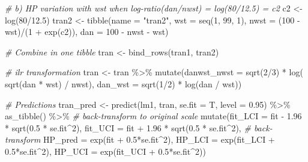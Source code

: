 \documentclass[
  12pt,
]{article}
\newenvironment{Shaded}{\begin{snugshade}}{\end{snugshade}}
\newcommand{\AttributeTok}[1]{\textcolor[rgb]{0.77,0.63,0.00}{#1}}
\newcommand{\CommentTok}[1]{\textcolor[rgb]{0.56,0.35,0.01}{\textit{#1}}}
\newcommand{\DecValTok}[1]{\textcolor[rgb]{0.00,0.00,0.81}{#1}}
\newcommand{\FloatTok}[1]{\textcolor[rgb]{0.00,0.00,0.81}{#1}}
\newcommand{\FunctionTok}[1]{\textcolor[rgb]{0.00,0.00,0.00}{#1}}
\newcommand{\NormalTok}[1]{#1}
\newcommand{\OtherTok}[1]{\textcolor[rgb]{0.56,0.35,0.01}{#1}}
\newcommand{\SpecialCharTok}[1]{\textcolor[rgb]{0.00,0.00,0.00}{#1}}
\newcommand{\StringTok}[1]{\textcolor[rgb]{0.31,0.60,0.02}{#1}}
\begin{document}
\begin{Shaded}
\begin{Highlighting}[]
\CommentTok{\# b) HP variation with wst when log{-}ratio(dan/nwst) = log(80/12.5) = c2}
\NormalTok{c2 }\OtherTok{\textless{}{-}} \FunctionTok{log}\NormalTok{(}\DecValTok{80}\SpecialCharTok{/}\FloatTok{12.5}\NormalTok{)}
\NormalTok{tran2 }\OtherTok{\textless{}{-}} \FunctionTok{tibble}\NormalTok{(}\AttributeTok{name =} \StringTok{"tran2"}\NormalTok{,}
                \AttributeTok{wst =} \FunctionTok{seq}\NormalTok{(}\DecValTok{1}\NormalTok{, }\DecValTok{99}\NormalTok{, }\DecValTok{1}\NormalTok{),}
                \AttributeTok{nwst =}\NormalTok{ (}\DecValTok{100} \SpecialCharTok{{-}}\NormalTok{ wst)}\SpecialCharTok{/}\NormalTok{(}\DecValTok{1} \SpecialCharTok{+} \FunctionTok{exp}\NormalTok{(c2)), }
                \AttributeTok{dan =} \DecValTok{100} \SpecialCharTok{{-}}\NormalTok{ nwst }\SpecialCharTok{{-}}\NormalTok{ wst)}

\CommentTok{\# Combine in one tibble}
\NormalTok{tran }\OtherTok{\textless{}{-}} \FunctionTok{bind\_rows}\NormalTok{(tran1, tran2)}

\CommentTok{\# ilr transformation}
\NormalTok{tran }\OtherTok{\textless{}{-}}\NormalTok{ tran }\SpecialCharTok{\%\textgreater{}\%} 
  \FunctionTok{mutate}\NormalTok{(}\AttributeTok{danwst\_nwst =} \FunctionTok{sqrt}\NormalTok{(}\DecValTok{2}\SpecialCharTok{/}\DecValTok{3}\NormalTok{) }\SpecialCharTok{*} \FunctionTok{log}\NormalTok{( }\FunctionTok{sqrt}\NormalTok{(dan }\SpecialCharTok{*}\NormalTok{ wst) }\SpecialCharTok{/}\NormalTok{ nwst),}
         \AttributeTok{dan\_wst =} \FunctionTok{sqrt}\NormalTok{(}\DecValTok{1}\SpecialCharTok{/}\DecValTok{2}\NormalTok{) }\SpecialCharTok{*} \FunctionTok{log}\NormalTok{(dan }\SpecialCharTok{/}\NormalTok{ wst))}

\CommentTok{\# Predictions}
\NormalTok{tran\_pred }\OtherTok{\textless{}{-}} \FunctionTok{predict}\NormalTok{(lm1, tran, }\AttributeTok{se.fit =}\NormalTok{ T, }\AttributeTok{level =} \FloatTok{0.95}\NormalTok{) }\SpecialCharTok{\%\textgreater{}\%} 
  \FunctionTok{as\_tibble}\NormalTok{() }\SpecialCharTok{\%\textgreater{}\%} 
  \CommentTok{\# back{-}transform to original scale}
  \FunctionTok{mutate}\NormalTok{(}\AttributeTok{fit\_LCI =}\NormalTok{ fit }\SpecialCharTok{{-}} \FloatTok{1.96} \SpecialCharTok{*} \FunctionTok{sqrt}\NormalTok{(}\FloatTok{0.5} \SpecialCharTok{*}\NormalTok{ se.fit}\SpecialCharTok{\^{}}\DecValTok{2}\NormalTok{),}
         \AttributeTok{fit\_UCI =}\NormalTok{ fit }\SpecialCharTok{+} \FloatTok{1.96} \SpecialCharTok{*} \FunctionTok{sqrt}\NormalTok{(}\FloatTok{0.5} \SpecialCharTok{*}\NormalTok{ se.fit}\SpecialCharTok{\^{}}\DecValTok{2}\NormalTok{),}
         \CommentTok{\# back{-}transform}
         \AttributeTok{HP\_pred =} \FunctionTok{exp}\NormalTok{(fit }\SpecialCharTok{+} \FloatTok{0.5}\SpecialCharTok{*}\NormalTok{se.fit}\SpecialCharTok{\^{}}\DecValTok{2}\NormalTok{),}
         \AttributeTok{HP\_LCI  =} \FunctionTok{exp}\NormalTok{(fit\_LCI }\SpecialCharTok{+} \FloatTok{0.5}\SpecialCharTok{*}\NormalTok{se.fit}\SpecialCharTok{\^{}}\DecValTok{2}\NormalTok{),}
         \AttributeTok{HP\_UCI  =} \FunctionTok{exp}\NormalTok{(fit\_UCI }\SpecialCharTok{+} \FloatTok{0.5}\SpecialCharTok{*}\NormalTok{se.fit}\SpecialCharTok{\^{}}\DecValTok{2}\NormalTok{))}


\end{Highlighting}
\end{Shaded}
\end{document}
